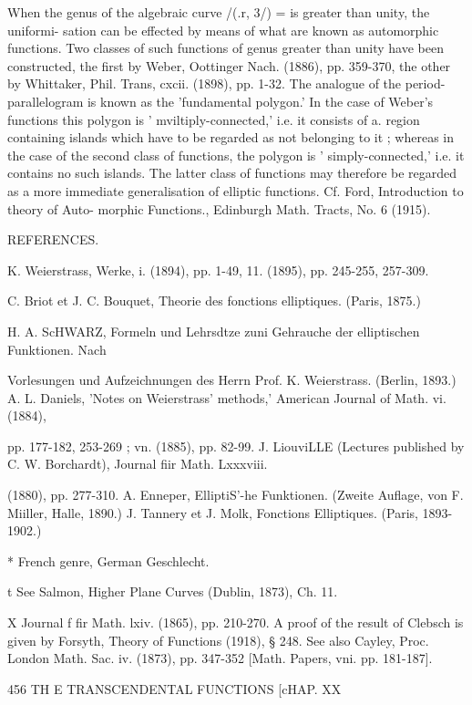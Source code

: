 {When the genus of the algebraic curve /(.r, 3/) = is greater than unity, the uniformi- 
sation can be effected by means of what are known as automorphic functions. Two classes 
of such functions of genus greater than unity have been constructed, the first by Weber, 
Oottinger Nach. (1886), pp. 359-370, the other by Whittaker, Phil. Trans, cxcii. (1898), 
pp. 1-32. The analogue of the period-parallelogram is known as the 'fundamental polygon.' 
In the case of Weber's functions this polygon is ' mviltiply-connected,' i.e. it consists of a. 
region containing islands which have to be regarded as not belonging to it ; whereas in 
the case of the second class of functions, the polygon is ' simply-connected,' i.e. it contains 
no such islands. The latter class of functions may therefore be regarded as a more 
immediate generalisation of elliptic functions. Cf. Ford, Introduction to theory of Auto- 
morphic Functions., Edinburgh Math. Tracts, No. 6 (1915). 

REFERENCES. 

K. Weierstrass, Werke, i. (1894), pp. 1-49, 11. (1895), pp. 245-255, 257-309. 

C. Briot et J. C. Bouquet, Theorie des fonctions elliptiques. (Paris, 1875.) 

H. A. ScHWARZ, Formeln und Lehrsdtze zuni Gehrauche der elliptischen Funktionen. Nach 

Vorlesungen und Aufzeichnungen des Herrn Prof. K. Weierstrass. (Berlin, 1893.) 
A. L. Daniels, 'Notes on Weierstrass' methods,' American Journal of Math. vi. (1884), 

pp. 177-182, 253-269 ; vn. (1885), pp. 82-99. 
J. LiouviLLE (Lectures published by C. W. Borchardt), Journal fiir Math. Lxxxviii. 

(1880), pp. 277-310. 
A. Enneper, ElliptiS'-he Funktionen. (Zweite Auflage, von F. Miiller, Halle, 1890.) 
J. Tannery et J. Molk, Fonctions Elliptiques. (Paris, 1893-1902.) 

* French genre, German Geschlecht. 

t See Salmon, Higher Plane Curves (Dublin, 1873), Ch. 11. 

X Journal f fir Math. lxiv. (1865), pp. 210-270. A proof of the result of Clebsch is given by 
Forsyth, Theory of Functions (1918), § 248. See also Cayley, Proc. London Math. Sac. iv. (1873), 
pp. 347-352 [Math. Papers, vni. pp. 181-187]. 



456 TH E TRANSCENDENTAL FUNCTIONS [cHAP. XX 

}
